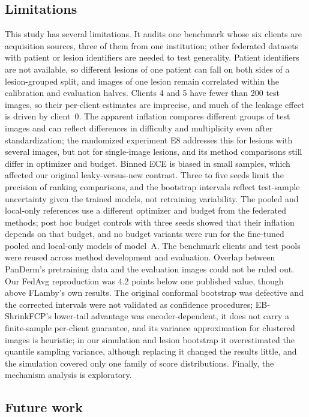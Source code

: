 \documentclass[VANCOUVER,Times1COL]{WileyNJDv5}
\begin{document}
\subsection{Limitations}

This study has several limitations. It audits one benchmark whose six clients are acquisition sources,
three of them from one institution; other federated datasets with patient or lesion identifiers are needed
to test generality. Patient identifiers are not available, so different lesions of one patient can fall on
both sides of a lesion-grouped split, and images of one lesion remain correlated within the calibration and
evaluation halves. Clients 4 and 5 have fewer than 200 test images, so their per-client estimates are
imprecise, and much of the leakage effect is driven by client~0. The apparent inflation compares different
groups of test images and can reflect differences in difficulty and multiplicity even after
standardization; the randomized experiment E8 addresses this for lesions with several images, but not for single-image lesions, and its method comparisons still differ in optimizer and budget. Binned ECE is biased in small samples, which affected our original leaky-versus-new
contrast. Three to five seeds limit the precision of ranking comparisons, and the bootstrap intervals
reflect test-sample uncertainty given the trained models, not retraining variability. The pooled and
local-only references use a different optimizer and budget from the federated methods; post hoc budget
controls with three seeds showed that their inflation depends on that budget, and no budget variants were
run for the fine-tuned pooled and local-only models of model~A. The benchmark clients and test pools were reused
across method development and evaluation. Overlap between PanDerm's pretraining data and the evaluation
images could not be ruled out. Our FedAvg reproduction was 4.2 points below one published value, though
above FLamby's own results. The original conformal bootstrap was defective and the corrected intervals were not validated as confidence procedures; EB-ShrinkFCP's lower-tail advantage was encoder-dependent, it does not carry a
finite-sample per-client guarantee, and its variance approximation for clustered images is heuristic; in
our simulation and lesion bootstrap it overestimated the quantile sampling variance, although replacing it changed the results little, and the simulation covered only one family of score distributions.
Finally, the mechanism analysis is exploratory.

\subsection{Future work}
\end{document}
